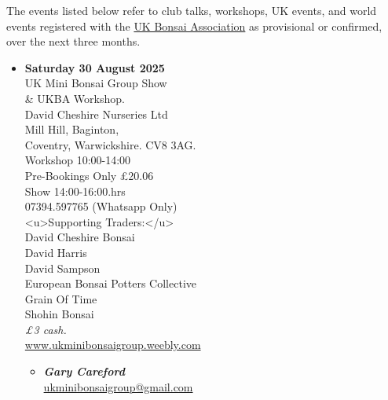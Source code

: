 \label{2025-08-events}
\noindent
The events listed below refer to club talks, workshops, UK events, and world events registered with the \href{https://www.ukbonsaiassoc.org/events.html}{UK Bonsai Association} as provisional or confirmed, over the next three months.

\begin{itemize}
    \item \textbf{Saturday 30 August 2025}
    \\
    UK Mini Bonsai Group Show \\
    \& UKBA Workshop. \\
    David Cheshire Nurseries Ltd \\
    Mill Hill, Baginton, \\
    Coventry, Warwickshire. CV8 3AG. \\
    Workshop 10:00-14:00 \\
    Pre-Bookings Only £20.06 \\
    Show 14:00-16:00.hrs \\
    07394.597765 (Whatsapp Only) \\
    <u>Supporting Traders:</u> \\
    David Cheshire Bonsai \\
    David Harris \\
    David Sampson \\
    European Bonsai Potters Collective \\
    Grain Of Time \\
    Shohin Bonsai
    \\
    \emph{£3 cash.}
    \\
    \href{https://www.ukminibonsaigroup.weebly.com}{www.ukminibonsaigroup.weebly.com}
    \begin{itemize}
        \item \textbf{\emph{Gary Careford}} \\
        \href{mailto:ukminibonsaigroup@gmail.com}{ukminibonsaigroup@gmail.com} 
    \end{itemize}


\end{itemize}
